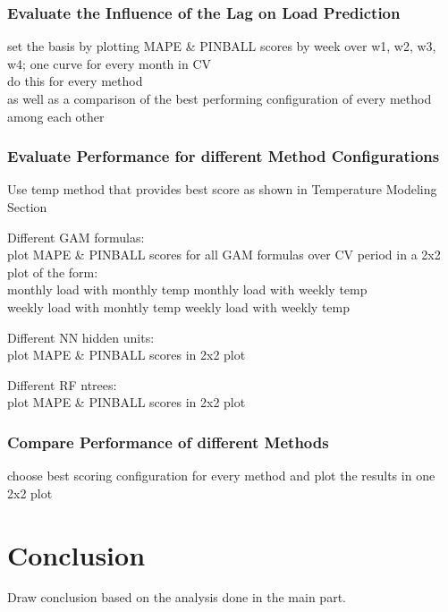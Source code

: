 \documentclass{article}
\begin{document}
\subsubsection{Evaluate the Influence of the Lag on Load Prediction}
set the basis by plotting MAPE \& PINBALL scores by week over w1, w2, w3, w4; one curve for every month in CV\\
do this for every method\\
as well as a comparison of the best performing configuration of every method among each other\\

\subsubsection{Evaluate Performance for different Method Configurations}
Use temp method that provides best score as shown in Temperature Modeling Section\par
Different GAM formulas:\\
plot MAPE \& PINBALL scores for all GAM formulas over CV period in a 2x2 plot of the form:\\
monthly load with monthly temp \quad monthly load with weekly temp\\
weekly load with monhtly temp \quad weekly load with weekly temp\par
\vspace*{5pt}
Different NN hidden units:\\
plot MAPE \& PINBALL scores in 2x2 plot\par
Different RF ntrees:\\ 
plot MAPE \& PINBALL scores in 2x2 plot\par

\subsubsection{Compare Performance of different Methods}
choose best scoring configuration for every method and plot the results in one 2x2 plot

\section{Conclusion}
Draw conclusion based on the analysis done in the main part.
\end{document}
